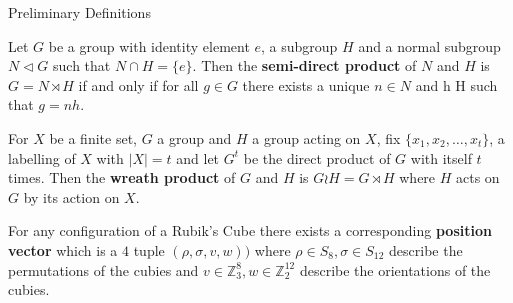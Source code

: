 \documentclass[final]{beamer}
\newlength{\colwidth}
\begin{document}
\begin{frame}[t]
\begin{columns}[t]
\begin{column}{\colwidth}



  \begin{alertblock}{Preliminary Definitions}


     Let $G$ be a group with identity element $e$, a subgroup $H$ and a normal subgroup $N \triangleleft G$ such that $N \cap H = \{e\}$.
    Then the \textbf{semi-direct product} of $N$ and $H$ is $G = N \rtimes H$ if and only if for all $g \in G$ there exists a unique $n \in N$ and h \in H such that $g = nh$.


For $X$ be a finite set, $G$ a group and $H$ a group acting on $X$,
fix $\{x_1,x_2, \dots, x_t\}$, a labelling of $X$ with $| X | = t$ and 
let $G^t$ be the direct product of $G$ with itself $t$ times.
Then the \textbf{wreath product} of $G$ and $H$ is $G \wr H = G \rtimes H$ where $H$ acts on $G$ by its action on $X$.





    

For any configuration of a Rubik's Cube there exists a corresponding \textbf{position vector} which is a $4$ tuple $(\rho, \sigma, v, w))$ where $\rho \in S_8, \sigma \in S_{12}$ describe the permutations of the cubies and $v \in \mathbb{Z}_3^8, w \in \mathbb{Z}_2^{12}$ describe the orientations of the cubies.


\end{alertblock}
\end{column}
\end{columns}
\end{frame}
\end{document}
